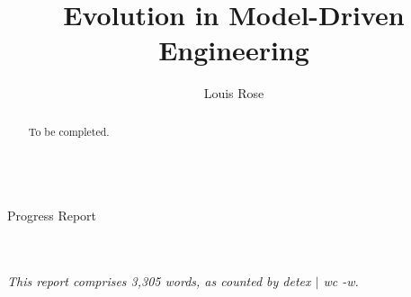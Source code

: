 \documentclass[a4paper,10pt]{article}
\title{Evolution in Model-Driven Engineering}
\author{Louis Rose}
\makeatletter
\renewcommand{\maketitle}{
  \begin{titlepage}
    \center
    \vspace*{\stretch{1}}
    \textsf{\huge \bfseries\sf \@title}\\
    \bigskip
    {\LARGE Progress Report}\\
    \vspace*{\stretch{1}}
    {\Large \@author}\\
    \bigskip
    {\Large \@date}\\
    \vspace*{\stretch{2}}
  \end{titlepage}
}
\makeatother
\begin{document}

\maketitle

\begin{abstract}
To be completed.
\end{abstract}

\vspace{2mm}

\begin{center}
  \small{\textit{This report comprises 3,305 words, as counted by detex $|$ wc -w.}}
\end{center}

\newpage
\tableofcontents
\newpage








\end{document}
